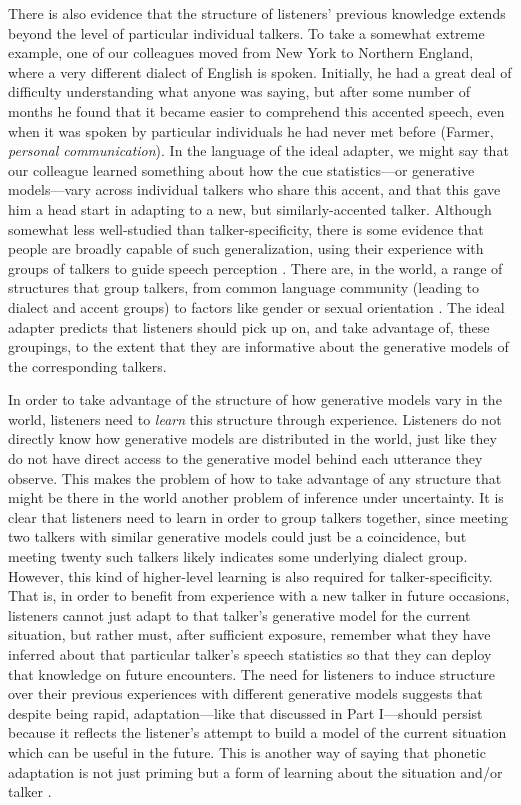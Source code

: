 There is also evidence that the structure of listeners' previous knowledge extends beyond the level of particular individual talkers.  To take a somewhat extreme example, one of our colleagues moved from New York to Northern England, where a very different dialect of English is spoken.  Initially, he had a great deal of difficulty understanding what anyone was saying, but after some number of months he found that it became easier to comprehend this accented speech, even when it was spoken by particular individuals he had never met before (Farmer, \emph{personal communication}).  In the language of the ideal adapter, we might say that our colleague learned something about how the cue statistics---or generative models---vary across individual talkers who share this accent, and that this gave him a head start in adapting to a new, but similarly-accented talker.  Although somewhat less well-studied than talker-specificity, there is some evidence that people are broadly capable of such generalization, using their experience with groups of talkers to guide speech perception \cite{Bradlow2008,Baese-berk2013,Creel2011,Johnson1999,Johnson2006,Niedzielski1999,Sidaras2009}.  There are, in the world, a range of structures that group talkers, from common language community (leading to dialect and accent groups) to factors like gender or sexual orientation \cite{Munson2007}.
The ideal adapter predicts that listeners should pick up on, and take advantage of, these groupings, to the extent that they are informative about the generative models of the corresponding talkers.

In order to take advantage of the structure of how generative models vary in the world, listeners need to \emph{learn} this structure through experience.  Listeners do not directly know how generative models are distributed in the world, just like they do not have direct access to the generative model behind each utterance they observe.  This makes the problem of how to take advantage of any structure that might be there in the world another problem of inference under uncertainty.   It is clear that listeners need to learn in order to group talkers together, since meeting two talkers with similar generative models could just be a coincidence, but meeting twenty such talkers likely indicates some underlying dialect group.  However, this kind of higher-level learning is also required for talker-specificity.  That is, in order to benefit from experience with a new talker in future occasions, listeners cannot just adapt to that talker's generative model for the current situation, but rather must, after sufficient exposure, remember what they have inferred about that particular talker's speech statistics so that they can deploy that knowledge on future encounters.  The need for listeners to induce structure over their previous experiences with different generative models suggests that despite being rapid, adaptation---like that discussed in Part I---should persist because it reflects the listener's attempt to build a model of the current situation which can be useful in the future.  This is another way of saying that phonetic adaptation is not just priming but a form of learning about the situation and/or talker \cite[among others]{Eisner2006,Kraljic2005,Kraljic2008a}.

